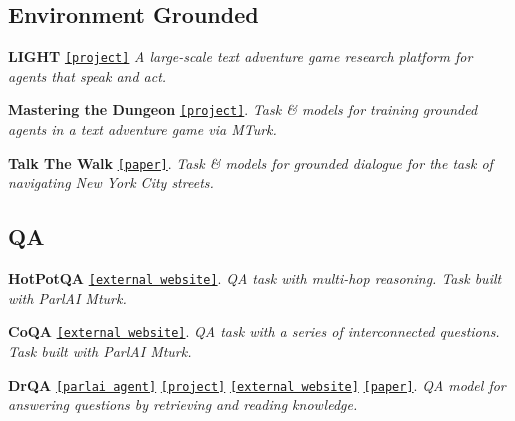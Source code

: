 \subsection*{Environment Grounded}


\begin{DoxyItemize}
\item {\bfseries L\+I\+G\+HT} \href{http://parl.ai/projects/light/}{\tt \mbox{[}project\mbox{]}} {\itshape A large-\/scale text adventure game research platform for agents that speak and act.}
\item {\bfseries Mastering the Dungeon} \href{https://github.com/facebookresearch/ParlAI/tree/master/projects/mastering_the_dungeon}{\tt \mbox{[}project\mbox{]}}. {\itshape Task \& models for training grounded agents in a text adventure game via M\+Turk.}
\item {\bfseries Talk The Walk} \href{https://arxiv.org/abs/1807.03367}{\tt \mbox{[}paper\mbox{]}}. {\itshape Task \& models for grounded dialogue for the task of navigating New York City streets.}
\end{DoxyItemize}

\subsection*{QA}


\begin{DoxyItemize}
\item {\bfseries Hot\+Pot\+QA} \href{https://hotpotqa.github.io/}{\tt \mbox{[}external website\mbox{]}}. {\itshape QA task with multi-\/hop reasoning. Task built with Parl\+AI Mturk.}
\item {\bfseries Co\+QA} \href{https://stanfordnlp.github.io/coqa/}{\tt \mbox{[}external website\mbox{]}}. {\itshape QA task with a series of interconnected questions. Task built with Parl\+AI Mturk.}
\item {\bfseries Dr\+QA} \href{https://github.com/facebookresearch/ParlAI/tree/master/parlai/agents/drqa}{\tt \mbox{[}parlai agent\mbox{]}} \href{https://github.com/facebookresearch/ParlAI/tree/master/projects/drqa}{\tt \mbox{[}project\mbox{]}} \href{https://github.com/facebookresearch/DrQA}{\tt \mbox{[}external website\mbox{]}} \href{https://arxiv.org/abs/1704.00051}{\tt \mbox{[}paper\mbox{]}}. {\itshape QA model for answering questions by retrieving and reading knowledge.} 
\end{DoxyItemize}